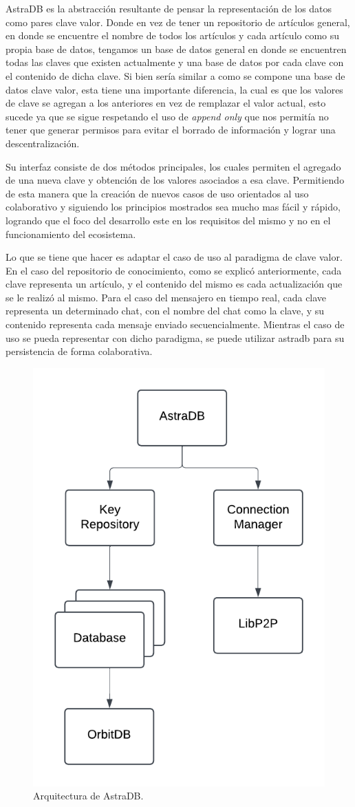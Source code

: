 AstraDB es la abstracción resultante de pensar la representación de los datos como pares clave valor. Donde en vez de tener un repositorio de artículos general, en donde se encuentre el nombre de todos los artículos y cada artículo como su propia base de datos, tengamos un base de datos general en donde se encuentren todas las claves que existen actualmente y una base de datos por cada clave con el contenido de dicha clave. Si bien sería similar a como se compone una base de datos clave valor, esta tiene una importante diferencia, la cual es que los valores de clave se agregan a los anteriores en vez de remplazar el valor actual, esto sucede ya que se sigue respetando el uso de \textit{append only} que nos permitía no tener que generar permisos para evitar el borrado de información y lograr una descentralización.

Su interfaz consiste de dos métodos principales, los cuales permiten el agregado de una nueva clave y obtención de los valores asociados a esa clave. Permitiendo de esta manera que la creación de nuevos casos de uso orientados al uso colaborativo y siguiendo los principios mostrados sea mucho mas fácil y rápido, 
logrando que el foco del desarrollo este en los requisitos del mismo y no en el funcionamiento del ecosistema.

Lo que se tiene que hacer es adaptar el caso de uso al paradigma de clave valor. En el caso del repositorio de conocimiento, como se explicó anteriormente, cada clave representa un artículo, y el contenido del mismo es cada actualización que se le realizó al mismo. Para el caso del mensajero en tiempo real, cada clave representa un determinado chat, con el nombre del chat como la clave, y su contenido representa cada mensaje enviado secuencialmente. Mientras el caso de uso se pueda representar con dicho paradigma, se puede utilizar astradb para su persistencia de forma colaborativa.

\begin{figure}[H]
    \centering
    \includegraphics[width=0.5\linewidth]{img/solucion-ipfs/astradb-arquitectura.png}
    \caption{Arquitectura de AstraDB.}
    \label{fig:astradb-arquitectura}
\end{figure}

